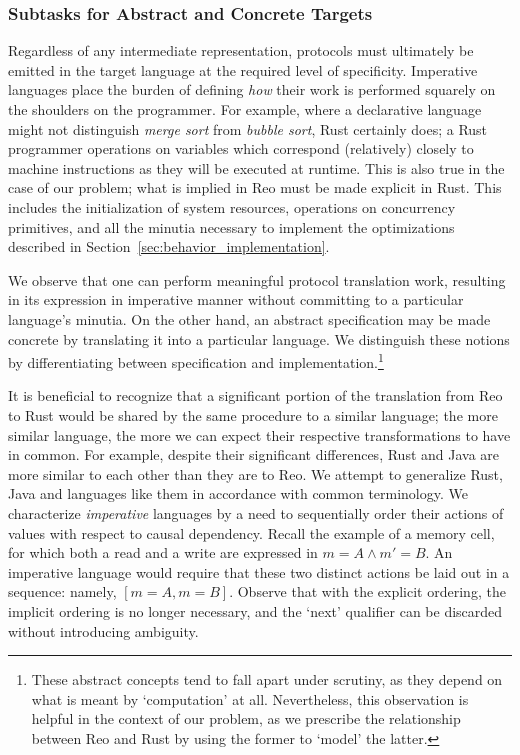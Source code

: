 \subsubsection{Subtasks for Abstract and Concrete Targets}
Regardless of any intermediate representation, protocols must ultimately be emitted in the target language at the required level of specificity. Imperative languages place the burden of defining \textit{how} their work is performed squarely on the shoulders on the programmer. For example, where a declarative language might not distinguish \textit{merge sort} from \textit{bubble sort}, Rust certainly does; a Rust programmer operations on variables which correspond (relatively) closely to machine instructions as they will be executed at runtime. This is also true in the case of our problem; what is implied in Reo must be made explicit in Rust. This includes the initialization of system resources, operations on concurrency primitives, and all the minutia necessary to implement the optimizations described in Section~\ref{sec:behavior_implementation}. 

We observe that one can perform meaningful protocol translation work, resulting in its expression in imperative manner without committing to a particular language's minutia. On the other hand, an abstract specification may be made concrete by translating it into a particular language. We distinguish these notions by differentiating between specification and implementation.\footnote{These abstract concepts tend to fall apart under scrutiny, as they depend on what is meant by `computation' at all. Nevertheless, this observation is helpful in the context of our problem, as we prescribe the relationship between Reo and Rust by using the former to `model' the latter.}  

It is beneficial to recognize that a significant portion of the translation from Reo to Rust would be shared by the same procedure to a similar language; the more similar language, the more we can expect their respective transformations to have in common. For example, despite their significant differences, Rust and Java are more similar to each other than they are to Reo. We attempt to generalize Rust, Java and languages like them in accordance with common terminology. We characterize \textit{imperative} languages by a need to sequentially order their actions of values with respect to causal dependency. Recall the example of a memory cell, for which both a read and a write are expressed in $m=A\wedge{}m'=B$. An imperative language would require that these two distinct actions be laid out in a sequence: namely, $[m=A, m=B]$. Observe that with the explicit ordering, the implicit ordering is no longer necessary, and the `next' qualifier can be discarded without introducing ambiguity.

